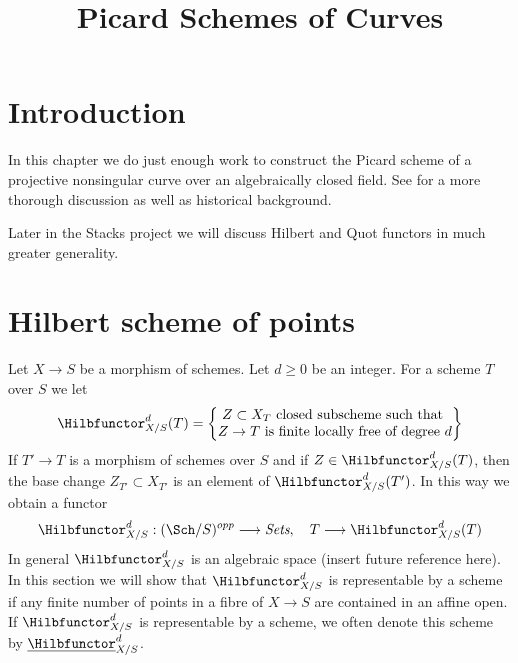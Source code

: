 

%


\title{Picard Schemes of Curves}


\maketitle

\label{section-phantom}

\tableofcontents


\section{Introduction}
\label{section-introduction}

\noindent
In this chapter we do just enough work to construct the Picard scheme
of a projective nonsingular curve over an algebraically closed field.
See \cite{Kleiman-Picard} for a more thorough discussion as well as
historical background.

\medskip\noindent
Later in the Stacks project we will discuss Hilbert and Quot functors
in much greater generality.


\section{Hilbert scheme of points}
\label{section-hilbert-scheme-points}

\noindent
Let $X \to S$ be a morphism of schemes. Let $d \geq 0$ be an integer.
For a scheme $T$ over $S$ we let
$$
\Hilbfunctor^d_{X/S}(T) =
\left\{
\begin{matrix}
Z \subset X_T\text{ closed subscheme such that }\\
Z \to T\text{ is finite locally free of degree }d
\end{matrix}
\right\}
$$
If $T' \to T$ is a morphism of schemes over $S$ and if
$Z \in \Hilbfunctor^d_{X/S}(T)$, then the base change
$Z_{T'} \subset X_{T'}$ is an element of $\Hilbfunctor^d_{X/S}(T')$.
In this way we obtain a functor
$$
\Hilbfunctor^d_{X/S} :
(\Sch/S)^{opp} \longrightarrow \textit{Sets},\quad
T \longrightarrow \Hilbfunctor^d_{X/S}(T)
$$
In general $\Hilbfunctor^d_{X/S}$ is an algebraic space
(insert future reference here). In this section we will
show that $\Hilbfunctor^d_{X/S}$ is representable
by a scheme if any finite number of points in a fibre of
$X \to S$ are contained in an affine open.
If $\Hilbfunctor^d_{X/S}$ is representable by a scheme, we often
denote this scheme by $\underline{\Hilbfunctor}^d_{X/S}$.

